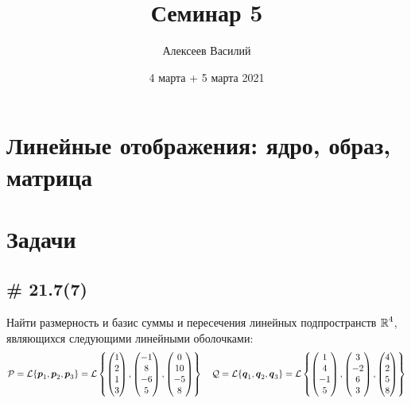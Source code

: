 \documentclass[a4paper,12pt]{article}
\author{Алексеев Василий}
\title{Семинар 5}
\date{4 марта + 5 марта 2021}
\begin{document}
  \maketitle
  
  \tableofcontents

  \thispagestyle{empty}
  
  \newpage
  


  \section{Линейные отображения: ядро, образ, матрица}
  
  \section{Задачи}
  
  
  \subsection{\# 21.7(7)}
  
  Найти размерность и базис суммы и пересечения линейных подпространств $\operatorname{\mathbb R}^4$, являющихся следующими линейными оболочками:
  \[
    \mathcal P = \mathcal L \{\boldsymbol p_1, \boldsymbol p_2, \boldsymbol p_3\} = \mathcal L \left\{
      \begin{pmatrix} 1 \\ 2 \\ 1 \\ 3 \end{pmatrix},
      \begin{pmatrix} -1 \\ 8 \\ -6 \\ 5 \end{pmatrix},
      \begin{pmatrix} 0 \\ 10 \\ -5 \\ 8 \end{pmatrix}
    \right\} \quad \mathcal Q = \mathcal L \{\boldsymbol q_1, \boldsymbol q_2, \boldsymbol q_3\} = \mathcal L \left\{
      \begin{pmatrix} 1 \\ 4 \\ -1 \\ 5 \end{pmatrix},
      \begin{pmatrix} 3 \\ -2 \\ 6 \\ 3 \end{pmatrix},
      \begin{pmatrix} 4 \\ 2 \\ 5 \\ 8 \end{pmatrix}
    \right\}
  \]
  
\end{document}
